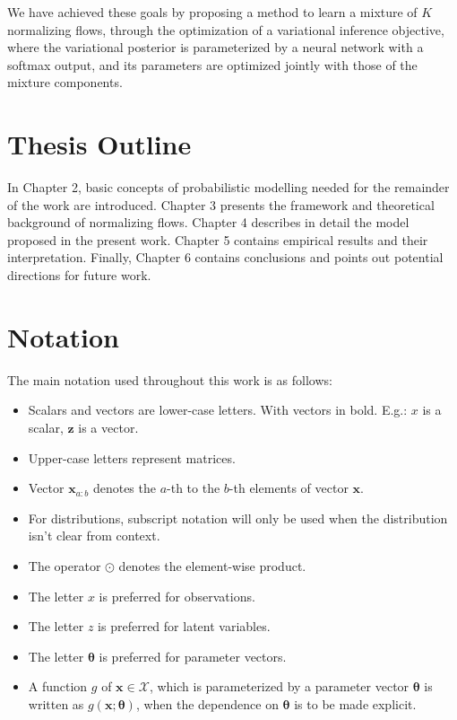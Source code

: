 We have achieved these goals by proposing a method to learn a mixture of
$K$ normalizing flows, through the optimization of a variational inference
objective, where the variational posterior is parameterized by a neural network
with a softmax output, and its parameters are optimized jointly with those of
the mixture components.

\section{Thesis Outline}
\label{section:outline}

In Chapter 2, basic concepts of probabilistic modelling needed for the remainder
of the work are introduced. Chapter 3 presents the framework and theoretical background
of normalizing flows. Chapter 4 describes in detail the model
proposed in the present work. Chapter 5 contains empirical results and their
interpretation. Finally, Chapter 6 contains conclusions and points out potential
directions for future work.

\section{Notation}
\label{section:notation}
The main notation used throughout this work is as follows:

\begin{itemize}
    \item Scalars and vectors are lower-case letters. With vectors in bold. E.g.:
    $x$ is a scalar, $\mathbf{z}$ is a vector.
    \item Upper-case letters represent matrices.
    \item Vector $\bm{x}_{a:b}$ denotes the $a$-th to the $b$-th elements
    of vector $\bm{x}$.
    \item For distributions, subscript notation will only be used when the
distribution isn't clear from context.
    \item The operator $\odot$ denotes the element-wise product.
    \item The letter $x$ is preferred for observations.
    \item The letter $z$ is preferred for latent variables.
    \item The letter $\bm\theta$ is preferred for parameter vectors.
    \item A function $g$ of $\bm{x} \in \bm{\mathcal{X}}$, which is parameterized
    by a parameter vector $\bm\theta$ is written as $g(\bm{x};\bm\theta)$, when
    the dependence on $\bm\theta$ is to be made explicit.
\end{itemize}

